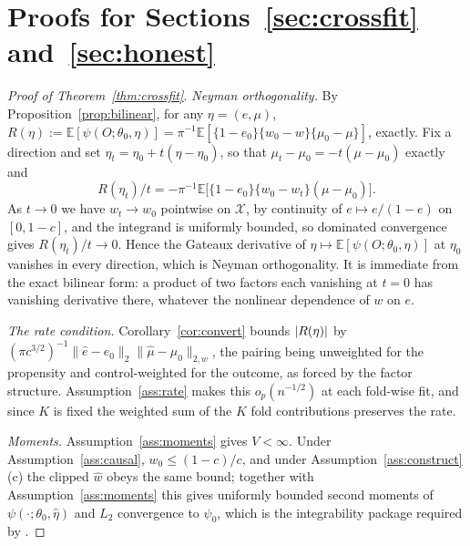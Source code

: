 \documentclass[11pt]{article}
\theoremstyle{plain}
\theoremstyle{definition}
\theoremstyle{remark}
\newcommand{\E}{\mathbb{E}}
\newcommand{\cX}{\mathcal{X}}
\newcommand{\ez}{e_0}
\newcommand{\mz}{\mu_0}
\newcommand{\wz}{w_0}
\newcommand{\ehat}{\widehat{e}}
\newcommand{\mhat}{\widehat{\mu}}
\newcommand{\what}{\widehat{w}}
\newcommand{\Ltwo}[1]{\lVert #1 \rVert_{2}}
\newcommand{\Lw}[1]{\lVert #1 \rVert_{2,w}}
\DeclarePairedDelimiter{\abs}{\lvert}{\rvert}
\begin{document}
\section{Proofs for Sections~\ref{sec:crossfit} and~\ref{sec:honest}}
\label{app:honest}

\begin{proof}[Proof of Theorem~\ref{thm:crossfit}]
\emph{Neyman orthogonality.} By Proposition~\ref{prop:bilinear}, for any
$\eta=(e,\mu)$,
$R(\eta):=\E[\psi(O;\theta_0,\eta)]
=\pi^{-1}\E[\{1-\ez\}\{\wz-w\}\{\mz-\mu\}]$, exactly. Fix a direction and set
$\eta_t=\eta_0+t(\eta-\eta_0)$, so that $\mu_t-\mz=-t(\mu-\mz)$ exactly and
\[
  R(\eta_t)/t=-\pi^{-1}\E\bigl[\{1-\ez\}\{\wz-w_t\}(\mu-\mz)\bigr].
\]
As $t\to0$ we have $w_t\to\wz$ pointwise on $\cX$, by
continuity of $e\mapsto e/(1-e)$ on $[0,1-c]$, and the integrand is uniformly
bounded, so dominated convergence gives $R(\eta_t)/t\to0$. Hence the Gateaux
derivative of $\eta\mapsto\E[\psi(O;\theta_0,\eta)]$ at $\eta_0$ vanishes in
every direction, which is Neyman orthogonality. It is immediate from the exact
bilinear form: a product of two factors each vanishing at $t=0$ has vanishing
derivative there, whatever the nonlinear dependence of $w$ on $e$.

\emph{The rate condition.} Corollary~\ref{cor:convert} bounds $\abs{R(\eta)}$ by
$(\pi c^{3/2})^{-1}\Ltwo{\ehat-\ez}\Lw{\mhat-\mz}$, the pairing being unweighted
for the propensity and control-weighted for the outcome, as forced by the factor
structure. Assumption~\ref{ass:rate} makes this $o_p(n^{-1/2})$ at each fold-wise
fit, and since $K$ is fixed the weighted sum of the $K$ fold contributions
preserves the rate.

\emph{Moments.} Assumption~\ref{ass:moments} gives $V<\infty$. Under
Assumption~\ref{ass:causal}, $\wz\le(1-c)/c$, and under
Assumption~\ref{ass:construct}(c) the clipped $\what$ obeys the same bound;
together with Assumption~\ref{ass:moments} this gives uniformly bounded second
moments of $\psi(\cdot;\theta_0,\widehat\eta)$ and $L_2$ convergence to $\psi_0$,
which is the integrability package required by \citet{chernozhukov2018}.


\end{proof}
\end{document}
